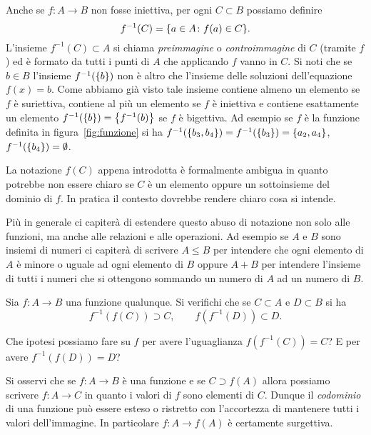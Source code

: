 Anche se $f\colon A \to B$ non fosse iniettiva,
per ogni $C\subset B$ possiamo definire
\[
  f^{-1}(C) = {\left\{ a\in A\colon f(a) \in C \right\}}.
\]
L'insieme $f^{-1}(C)\subset A$ si chiama \emph{preimmagine}
o \emph{controimmagine}
%
%
%
%
%
di $C$ (tramite $f$)
ed è formato da tutti i punti di $A$ che applicando $f$ vanno in $C$.
Si noti che se $b\in B$ l'insieme $f^{-1}({\left\{ b \right\}})$ non è altro che
l'insieme delle soluzioni dell'equazione $f(x)=b$. Come abbiamo
già visto tale insieme contiene almeno un elemento se $f$ è suriettiva,
contiene al più un elemento se $f$ è iniettiva e contiene esattamente
un elemento $f^{-1}({\left\{ b \right\}}) = {\left\{ f^{-1}(b) \right\}}$ se $f$ è bigettiva.
Ad esempio se $f$ è la funzione definita in figura~\ref{fig:funzione}
si ha $f^{-1}({\left\{ b_3,b_4 \right\}}) = f^{-1}({\left\{ b_3 \right\}}) = {\left\{ a_2,a_4 \right\}}$,
$f^{-1}({\left\{ b_4 \right\}}) = \emptyset$.


La notazione $f(C)$ appena introdotta è formalmente ambigua in quanto
potrebbe non essere chiaro se $C$ è un elemento oppure un sottoinsieme
del dominio di $f$.
In pratica il contesto dovrebbe rendere chiaro cosa si intende.

Più in generale ci capiterà di estendere questo abuso di notazione non solo
alle funzioni, ma anche alle relazioni e alle operazioni.
Ad esempio se $A$ e $B$ sono insiemi di numeri ci capiterà di scrivere $A\le B$
per intendere che ogni elemento di $A$ è minore o uguale ad ogni elemento di $B$
oppure $A+B$ per intendere l'insieme di tutti i numeri che si ottengono sommando
un numero di $A$ ad un numero di $B$.

\begin{exercise}
  Sia $f\colon A \to B$ una funzione qualunque. 
  Si verifichi che se $C\subset A$ e $D\subset B$ si ha 
  \[
    f^{-1}(f(C))\supset C,
    \qquad 
    f(f^{-1}(D)) \subset D. 
  \]
  
  Che ipotesi possiamo fare su $f$ per avere l'uguaglianza
  $f(f^{-1}(C)) = C$?
  E per avere $f^{-1}(f(D)) = D$?
\end{exercise}

Si osservi che se $f\colon A \to B$ è una funzione e 
se $C\supset f(A)$ allora possiamo scrivere $f\colon A \to C$ in quanto 
i valori di $f$ sono elementi di $C$. Dunque il \emph{codominio} di una 
funzione può essere esteso o ristretto con l'accortezza di mantenere 
tutti i valori dell'immagine. 
In particolare $f\colon A \to f(A)$ è certamente surgettiva.

